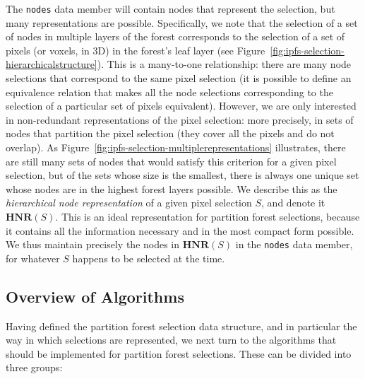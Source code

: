 \noindent The \texttt{nodes} data member will contain nodes that represent the selection, but many representations are possible. Specifically, we note that the selection of a set of nodes in multiple layers of the forest corresponds to the selection of a set of pixels (or voxels, in 3D) in the forest's leaf layer (see Figure~\ref{fig:ipfs-selection-hierarchicalstructure}). This is a many-to-one relationship: there are many node selections that correspond to the same pixel selection (it is possible to define an equivalence relation that makes all the node selections corresponding to the selection of a particular set of pixels equivalent). However, we are only interested in non-redundant representations of the pixel selection: more precisely, in sets of nodes that partition the pixel selection (they cover all the pixels and do not overlap). As Figure~\ref{fig:ipfs-selection-multiplerepresentations} illustrates, there are still many sets of nodes that would satisfy this criterion for a given pixel selection, but of the sets whose size is the smallest, there is always one unique set whose nodes are in the highest forest layers possible. We describe this as the \emph{hierarchical node representation} of a given pixel selection $S$, and denote it $\textbf{HNR}(S)$. This is an ideal representation for partition forest selections, because it contains all the information necessary and in the most compact form possible. We thus maintain precisely the nodes in $\textbf{HNR}(S)$ in the \texttt{nodes} data member, for whatever $S$ happens to be selected at the time.

\subsection{Overview of Algorithms}

Having defined the partition forest selection data structure, and in particular the way in which selections are represented, we next turn to the algorithms that should be implemented for partition forest selections. These can be divided into three groups:

